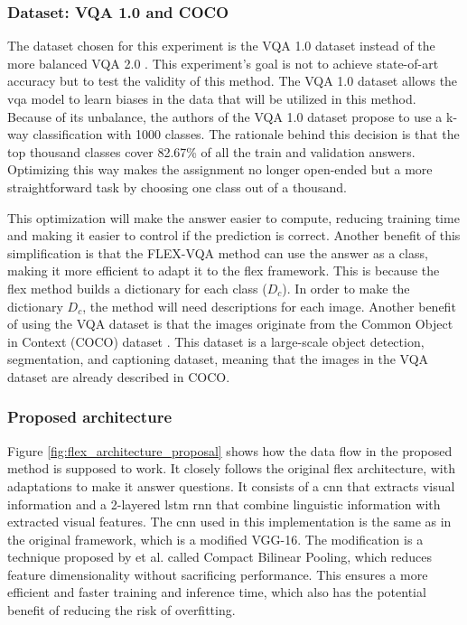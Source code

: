         \subsubsection{Dataset: VQA 1.0 and COCO}
        The dataset chosen for this experiment is the VQA 1.0 dataset \cite{agrawalVQAVisualQuestion2016} instead of the more balanced VQA 2.0 \cite{goyalMakingVQAMatter2017}. 
        This experiment's goal is not to achieve state-of-art accuracy but to test the validity of this method. The VQA 1.0 dataset allows the \gls{vqa} model to learn biases in the data that will be utilized in this method. Because of its unbalance, the authors of the VQA 1.0 dataset propose to use a k-way classification with 1000 classes. The rationale behind this decision is that the top thousand classes cover 82.67\% of all the train and validation answers. Optimizing this way makes the assignment no longer open-ended but a more straightforward task by choosing one class out of a thousand. 
        
        This optimization will make the answer easier to compute, reducing training time and making it easier to control if the prediction is correct. Another benefit of this simplification is that the FLEX-VQA method can use the answer as a class, making it more efficient to adapt it to the \gls{flex} framework. This is because the \gls{flex} method builds a dictionary for each class ($D_c$). 
        In order to make the dictionary $D_c$, the method will need descriptions for each image. 
        Another benefit of using the VQA dataset is that the images originate from the Common Object in Context (COCO) dataset \cite{linMicrosoftCOCOCommon2015}. This dataset is a large-scale object detection, segmentation, and captioning dataset, meaning that the images in the VQA dataset are already described in COCO. 
       

        \subsubsection{Proposed architecture}
        \label{sec:3_proposed_architecture}
        
        Figure \ref{fig:flex_architecture_proposal} shows how the data flow in the proposed method is supposed to work. It closely follows the original \gls{flex} architecture, with adaptations to make it answer questions. It consists of a \gls{cnn} that extracts visual information and a 2-layered \gls{lstm} \cite{hochreiterLongShorttermMemory1997} \gls{rnn} that combine linguistic information with extracted visual features. 
        The \gls{cnn} used in this implementation is the same as in the original framework, which is a modified VGG-16. The modification is a technique proposed by \cite{gaoCompactBilinearPooling2016} et al. called Compact Bilinear Pooling, which reduces feature dimensionality without sacrificing performance. This ensures a more efficient and faster training and inference time, which also has the potential benefit of reducing the risk of overfitting.


